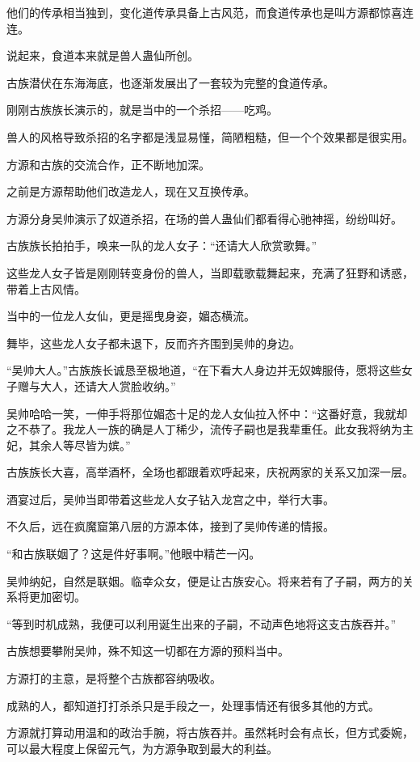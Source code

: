 \begin{this_body}
他们的传承相当独到，变化道传承具备上古风范，而食道传承也是叫方源都惊喜连连。

说起来，食道本来就是兽人蛊仙所创。

古族潜伏在东海海底，也逐渐发展出了一套较为完整的食道传承。

刚刚古族族长演示的，就是当中的一个杀招——吃鸡。

兽人的风格导致杀招的名字都是浅显易懂，简陋粗糙，但一个个效果都是很实用。

方源和古族的交流合作，正不断地加深。

之前是方源帮助他们改造龙人，现在又互换传承。

方源分身吴帅演示了奴道杀招，在场的兽人蛊仙们都看得心驰神摇，纷纷叫好。

古族族长拍拍手，唤来一队的龙人女子：“还请大人欣赏歌舞。”

这些龙人女子皆是刚刚转变身份的兽人，当即载歌载舞起来，充满了狂野和诱惑，带着上古风情。

当中的一位龙人女仙，更是摇曳身姿，媚态横流。

舞毕，这些龙人女子都未退下，反而齐齐围到吴帅的身边。

“吴帅大人。”古族族长诚恳至极地道，“在下看大人身边并无奴婢服侍，愿将这些女子赠与大人，还请大人赏脸收纳。”

吴帅哈哈一笑，一伸手将那位媚态十足的龙人女仙拉入怀中：“这番好意，我就却之不恭了。我龙人一族的确是人丁稀少，流传子嗣也是我辈重任。此女我将纳为主妃，其余人等尽皆为嫔。”

古族族长大喜，高举酒杯，全场也都跟着欢呼起来，庆祝两家的关系又加深一层。

酒宴过后，吴帅当即带着这些龙人女子钻入龙宫之中，举行大事。

不久后，远在疯魔窟第八层的方源本体，接到了吴帅传递的情报。

“和古族联姻了？这是件好事啊。”他眼中精芒一闪。

吴帅纳妃，自然是联姻。临幸众女，便是让古族安心。将来若有了子嗣，两方的关系将更加密切。

“等到时机成熟，我便可以利用诞生出来的子嗣，不动声色地将这支古族吞并。”

古族想要攀附吴帅，殊不知这一切都在方源的预料当中。

方源打的主意，是将整个古族都容纳吸收。

成熟的人，都知道打打杀杀只是手段之一，处理事情还有很多其他的方式。

方源就打算动用温和的政治手腕，将古族吞并。虽然耗时会有点长，但方式委婉，可以最大程度上保留元气，为方源争取到最大的利益。


\end{this_body}
